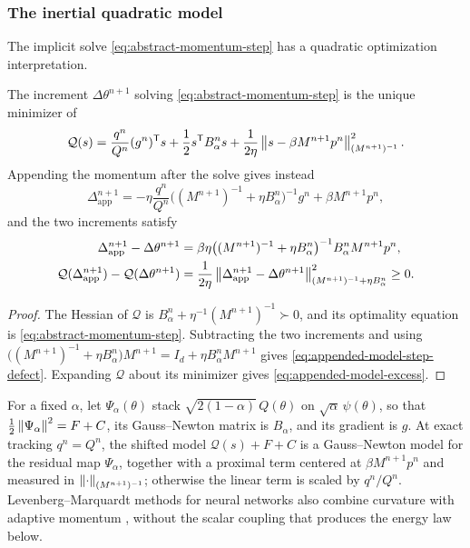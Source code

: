 \subsubsection{The inertial quadratic model}
\label{sec:momentum-filtering}

The implicit solve \cref{eq:abstract-momentum-step} has a quadratic
optimization interpretation.

\begin{proposition}
\label{prop:inertial-model}
The increment \(\Delta\theta^{n+1}\) solving
\cref{eq:abstract-momentum-step} is the unique minimizer of
\begin{equation}
  \mathcal Q(s)
  =\frac{q^n}{Q^n}(g^n)^{\mathsf T}s
  +\frac12 s^{\mathsf T}B_\alpha^ns
  +\frac{1}{2\eta}\left\lVert s-\beta M^{n+1}p^n\right\rVert_{(M^{n+1})^{-1}}^2 .
  \label{eq:inertial-quadratic-model}
\end{equation}
Appending the momentum after the solve gives instead
\begin{equation}
  \Delta_{\mathrm{app}}^{n+1}
  =-\eta\frac{q^n}{Q^n}
    \bigl((M^{n+1})^{-1}+\eta B_\alpha^n\bigr)^{-1}g^n
   +\beta M^{n+1}p^n,
  \label{eq:frozen-appended-comparator}
\end{equation}
and the two increments satisfy
\begin{align}
  \Delta_{\mathrm{app}}^{n+1}-\Delta\theta^{n+1}
  &=\beta\eta\bigl((M^{n+1})^{-1}+\eta B_\alpha^n\bigr)^{-1}
    B_\alpha^nM^{n+1}p^n,
  \label{eq:appended-model-step-defect}\\
  \mathcal Q(\Delta_{\mathrm{app}}^{n+1})-\mathcal Q(\Delta\theta^{n+1})
  &=\frac{1}{2\eta}
  \left\lVert\Delta_{\mathrm{app}}^{n+1}-\Delta\theta^{n+1}\right\rVert
       _{(M^{n+1})^{-1}+\eta B_\alpha^n}^2\geq0.
  \label{eq:appended-model-excess}
\end{align}
\end{proposition}

\begin{proof}
The Hessian of \(\mathcal Q\) is
\(B_\alpha^n+\eta^{-1}(M^{n+1})^{-1}\succ0\), and its optimality equation is
\cref{eq:abstract-momentum-step}. Subtracting the two increments and using
\(\bigl((M^{n+1})^{-1}+\eta B_\alpha^n\bigr)M^{n+1}
 =I_d+\eta B_\alpha^nM^{n+1}\) gives
\cref{eq:appended-model-step-defect}. Expanding \(\mathcal Q\) about its
minimizer gives \cref{eq:appended-model-excess}.
\end{proof}

\begin{remark}
\label{rem:inertial-gauss-newton}
For a fixed \(\alpha\), let \(\Psi_\alpha(\theta)\) stack
\(\sqrt{2(1-\alpha)}\,Q(\theta)\) on \(\sqrt{\alpha}\,\psi(\theta)\), so that
\(\tfrac12\left\lVert\Psi_\alpha\right\rVert^2=F+C\), its Gauss--Newton matrix is
\(B_\alpha\), and its gradient is \(g\). At exact
tracking \(q^n=Q^n\), the shifted model \(\mathcal Q(s)+F+C\) is a
Gauss--Newton model for the residual map \(\Psi_\alpha\), together with a
proximal term centered at \(\beta M^{n+1}p^n\) and measured in
\(\left\lVert\cdot\right\rVert_{(M^{n+1})^{-1}}\); otherwise the linear term is scaled by
\(q^n/Q^n\). Levenberg--Marquardt methods for neural networks also combine curvature with
adaptive momentum \cite{pooladzandi2022improving}, without the scalar
coupling that produces the energy law below.
\end{remark}

